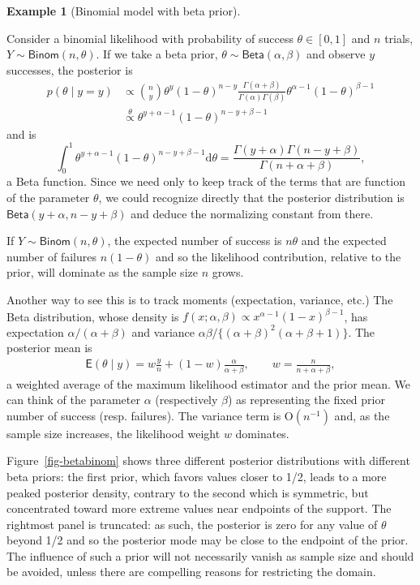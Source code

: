 \documentclass[
  11pt,
  letterpaper,
]{scrbook}
\theoremstyle{definition}
\newtheorem{example}{Example}[chapter]
\theoremstyle{definition}
\theoremstyle{definition}
\theoremstyle{plain}
\theoremstyle{remark}
\begin{document}
\begin{example}[Binomial model with beta
prior]\protect\hypertarget{exm-betabinomconjugate}{}\label{exm-betabinomconjugate}

Consider a binomial likelihood with probability of success
\(\theta \in [0,1]\) and \(n\) trials,
\(Y \sim \mathsf{Binom}(n, \theta)\). If we take a beta prior,
\(\theta \sim \mathsf{Beta}(\alpha, \beta)\) and observe \(y\)
successes, the posterior is \begin{align*}
p(\theta \mid y = y) &\propto \binom{n}{y} \theta^y (1-\theta)^{n-y} \frac{\Gamma(\alpha + \beta)}{\Gamma(\alpha) \Gamma(\beta)}\theta^{\alpha-1} (1-\theta)^{\beta-1}
\\&\stackrel{\theta}{\propto} \theta^{y+\alpha-1}(1-\theta)^{n-y+\beta-1}
\end{align*} and is
\[\int_{0}^{1} \theta^{y+\alpha-1}(1-\theta)^{n-y+\beta-1}\mathrm{d} \theta = \frac{\Gamma(y+\alpha)\Gamma(n-y+\beta)}{\Gamma(n+\alpha+\beta)},\]
a Beta function. Since we need only to keep track of the terms that are
function of the parameter \(\theta\), we could recognize directly that
the posterior distribution is \(\mathsf{Beta}(y+\alpha, n-y+\beta)\) and
deduce the normalizing constant from there.

If \(Y \sim \mathsf{Binom}(n, \theta)\), the expected number of success
is \(n\theta\) and the expected number of failures \(n(1-\theta)\) and
so the likelihood contribution, relative to the prior, will dominate as
the sample size \(n\) grows.

Another way to see this is to track moments (expectation, variance,
etc.) The Beta distribution, whose density is
\(f(x; \alpha, \beta) \propto x^{\alpha-1} (1-x)^{\beta-1}\), has
expectation \(\alpha/(\alpha+\beta)\) and variance
\(\alpha\beta/\{(\alpha+\beta)^2(\alpha+\beta+1)\}\). The posterior mean
is \begin{align*}
 \mathsf{E}(\theta \mid y) = w\frac{y}{n} + (1-w) \frac{\alpha}{\alpha+\beta}, 
 \qquad w = \frac{n}{n+\alpha + \beta},
 \end{align*} a weighted average of the maximum likelihood estimator and
the prior mean. We can think of the parameter \(\alpha\) (respectively
\(\beta\)) as representing the fixed prior number of success (resp.
failures). The variance term is \(\mathrm{O}(n^{-1})\) and, as the
sample size increases, the likelihood weight \(w\) dominates.

Figure~\ref{fig-betabinom} shows three different posterior distributions
with different beta priors: the first prior, which favors values closer
to 1/2, leads to a more peaked posterior density, contrary to the second
which is symmetric, but concentrated toward more extreme values near
endpoints of the support. The rightmost panel is truncated: as such, the
posterior is zero for any value of \(\theta\) beyond 1/2 and so the
posterior mode may be close to the endpoint of the prior. The influence
of such a prior will not necessarily vanish as sample size and should be
avoided, unless there are compelling reasons for restricting the domain.


\end{example}
\end{document}
